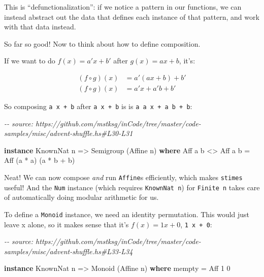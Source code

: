 \documentclass[]{article}
\newenvironment{Shaded}{}{}
\newcommand{\CommentTok}[1]{\textcolor[rgb]{0.38,0.63,0.69}{\textit{#1}}}
\newcommand{\DataTypeTok}[1]{\textcolor[rgb]{0.56,0.13,0.00}{#1}}
\newcommand{\DecValTok}[1]{\textcolor[rgb]{0.25,0.63,0.44}{#1}}
\newcommand{\FunctionTok}[1]{\textcolor[rgb]{0.02,0.16,0.49}{#1}}
\newcommand{\KeywordTok}[1]{\textcolor[rgb]{0.00,0.44,0.13}{\textbf{#1}}}
\newcommand{\NormalTok}[1]{#1}
\newcommand{\OperatorTok}[1]{\textcolor[rgb]{0.40,0.40,0.40}{#1}}
\newcommand{\OtherTok}[1]{\textcolor[rgb]{0.00,0.44,0.13}{#1}}
\begin{document}
This is ``defunctionalization'': if we notice a pattern in our functions, we can
instead abstract out the data that defines each instance of that pattern, and
work with that data instead.

So far so good! Now to think about how to define composition.

If we want to do \(f(x) = a' x + b'\) after \(g(x) = a x + b\), it's:

\[
\begin{aligned}
(f \circ g)(x) & = a' (a x + b) + b'\\
  (f \circ g)(x) & = a' x + a' b + b'
\end{aligned}
\]

So composing \texttt{a\textquotesingle{}\ x\ +\ b\textquotesingle{}} after
\texttt{a\ x\ +\ b} is is
\texttt{a\textquotesingle{}\ a\ x\ +\ a\textquotesingle{}\ b\ +\ b\textquotesingle{}}:

\begin{Shaded}
\begin{Highlighting}[]
\CommentTok{{-}{-} source: https://github.com/mstksg/inCode/tree/master/code{-}samples/misc/advent{-}shuffle.hs\#L30{-}L31}

\KeywordTok{instance} \DataTypeTok{KnownNat}\NormalTok{ n }\OtherTok{=\textgreater{}} \DataTypeTok{Semigroup}\NormalTok{ (}\DataTypeTok{Affine}\NormalTok{ n) }\KeywordTok{where}
    \DataTypeTok{Aff}\NormalTok{ a\textquotesingle{} b\textquotesingle{} }\OperatorTok{\textless{}\textgreater{}} \DataTypeTok{Aff}\NormalTok{ a b }\OtherTok{=} \DataTypeTok{Aff}\NormalTok{ (a\textquotesingle{} }\OperatorTok{*}\NormalTok{ a) (a\textquotesingle{} }\OperatorTok{*}\NormalTok{ b }\OperatorTok{+}\NormalTok{ b\textquotesingle{})}
\end{Highlighting}
\end{Shaded}

Neat! We can now compose \emph{and} run \texttt{Affine}s efficiently, which
makes \texttt{stimes} useful! And the \texttt{Num} instance (which requires
\texttt{KnownNat\ n}) for \texttt{Finite\ n} takes care of automatically doing
modular arithmetic for us.

To define a \texttt{Monoid} instance, we need an identity permutation. This
would just leave x alone, so it makes sense that it's \(f(x) = 1 x + 0\),
\texttt{1\ x\ +\ 0}:

\begin{Shaded}
\begin{Highlighting}[]
\CommentTok{{-}{-} source: https://github.com/mstksg/inCode/tree/master/code{-}samples/misc/advent{-}shuffle.hs\#L33{-}L34}

\KeywordTok{instance} \DataTypeTok{KnownNat}\NormalTok{ n }\OtherTok{=\textgreater{}} \DataTypeTok{Monoid}\NormalTok{ (}\DataTypeTok{Affine}\NormalTok{ n) }\KeywordTok{where}
    \FunctionTok{mempty} \OtherTok{=} \DataTypeTok{Aff} \DecValTok{1} \DecValTok{0}
\end{Highlighting}
\end{Shaded}
\end{document}
